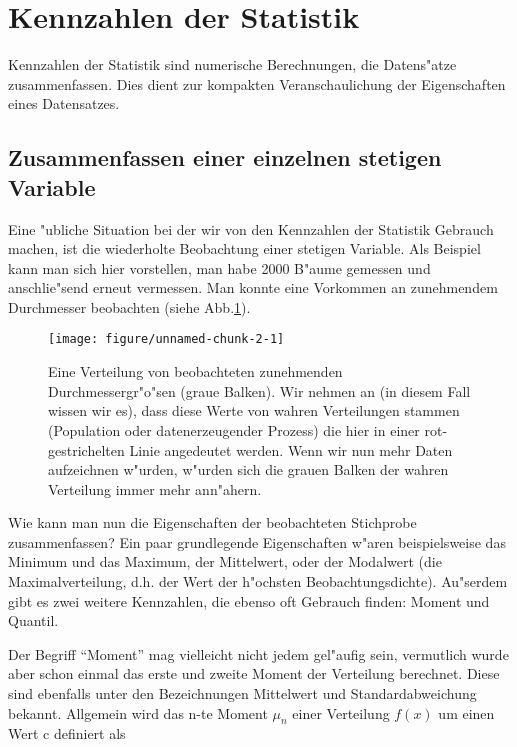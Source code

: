 \documentclass[a4paper,twoside]{tufte-book}\usepackage[]{graphicx}\usepackage[]{color}
\makeatletter
\def\maxwidth{ %
  \ifdim\Gin@nat@width>\linewidth
    \linewidth
  \else
    \Gin@nat@width
  \fi
}
\makeatother
\begin{document}
	\section{Kennzahlen der Statistik}
	
	Kennzahlen der Statistik sind numerische Berechnungen, die Datens"atze zusammenfassen. Dies dient zur kompakten Veranschaulichung der Eigenschaften eines Datensatzes.
	
	\subsection{Zusammenfassen einer einzelnen stetigen Variable}
	
	Eine "ubliche Situation bei der wir von den Kennzahlen der Statistik Gebrauch machen, ist die wiederholte Beobachtung einer stetigen Variable. Als Beispiel kann man sich hier vorstellen, man habe 2000 B"aume gemessen und anschlie"send erneut vermessen. Man konnte eine Vorkommen an zunehmendem Durchmesser beobachten (siehe Abb.\ref{fig: data distribution}).

\begin{figure}[htbp]
\begin{center}
\begin{Schunk}

\texttt{[image: figure/unnamed-chunk-2-1]} \end{Schunk}
\caption{Eine Verteilung von beobachteten zunehmenden Durchmessergr"o"sen (graue Balken). Wir nehmen an (in diesem Fall wissen wir es), dass diese Werte von wahren Verteilungen stammen (Population oder datenerzeugender Prozess) die hier in einer rot-gestrichelten Linie angedeutet werden. Wenn wir nun mehr Daten aufzeichnen w"urden, w"urden sich die grauen Balken der wahren Verteilung immer mehr ann"ahern.}
\label{fig: data distribution}
\end{center}
\end{figure}

Wie kann man nun die Eigenschaften der beobachteten Stichprobe zusammenfassen? Ein paar grundlegende Eigenschaften w"aren beispielsweise das Minimum und das Maximum, der Mittelwert, oder der Modalwert (die Maximalverteilung, d.h. der Wert der h"ochsten Beobachtungsdichte). Au"serdem  gibt es zwei weitere Kennzahlen, die ebenso oft Gebrauch finden: Moment und Quantil.


Der Begriff "`Moment"' mag vielleicht nicht jedem gel"aufig sein, vermutlich wurde aber schon einmal das erste und zweite Moment der Verteilung berechnet. Diese sind ebenfalls unter den Bezeichnungen Mittelwert und Standardabweichung bekannt. Allgemein wird das n-te Moment $\mu_n$ einer Verteilung $f(x)$ um einen Wert c definiert als 
\end{document}
